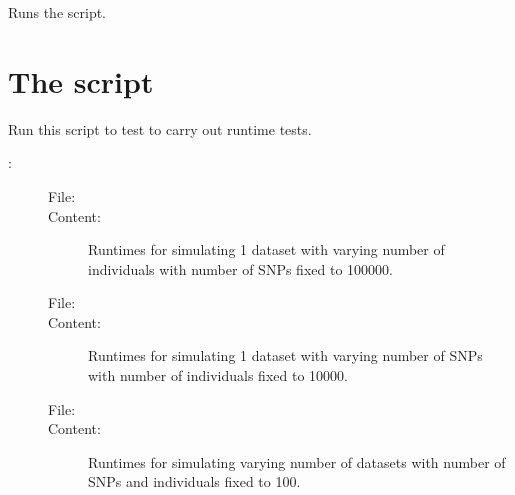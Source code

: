 \documentclass[a4paper,10pt,english]{sphinxhowto}
\begin{document}
\begin{fulllineitems}
\label{\detokenize{merge_genotype_corpora:merge_genotype_corpora.run_script}}
Runs the script.

\end{fulllineitems}



\section{The script }
\label{\detokenize{test_runtime:module-test_runtime}}\label{\detokenize{test_runtime:the-script-test-runtime-py}}\label{\detokenize{test_runtime::doc}}
Run this script to test to carry out runtime tests.

:

\begin{sphinxVerbatim}[commandchars=\\\{\}]
 
\end{sphinxVerbatim}
\begin{description}
\item[{}] \leavevmode\begin{description}
\item[{File:}] \leavevmode
{}

\item[{Content:}] \leavevmode
Runtimes for simulating 1 dataset with varying number of individuals with number of SNPs fixed to 100000.

\item[{File:}] \leavevmode
{}

\item[{Content:}] \leavevmode
Runtimes for simulating 1 dataset with varying number of SNPs with number of individuals fixed to 10000.

\item[{File:}] \leavevmode
{}

\item[{Content:}] \leavevmode
Runtimes for simulating varying number of datasets with number of SNPs and individuals fixed to 100.

\end{description}

\end{description}
\end{document}
